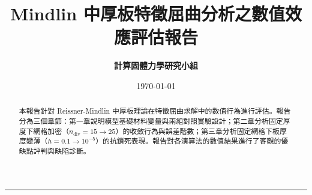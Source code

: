\documentclass[11pt, a4paper]{article}
\title{\textbf{\sffamily Mindlin 中厚板特徵屈曲分析之數值效應評估報告}}
\author{\textbf{計算固體力學研究小組}}
\date{\today}
\begin{document}
\maketitle

\begin{abstract}
本報告針對 Reissner-Mindlin 中厚板理論在特徵屈曲求解中的數值行為進行評估。報告分為三個章節：第一章說明模型基礎材料變量與兩組對照實驗設計；第二章分析固定厚度下網格加密（$n_{\mathrm{div}} = 15 \to 25$）的收斂行為與誤差階數；第三章分析固定網格下板厚度變薄（$h = 0.1 \to 10^{-5}$）的抗鎖死表現。報告對各演算法的數值結果進行了客觀的優缺點評判與缺陷診斷。
\end{abstract}

\hrule
\vspace{1.5em}




\end{document}

